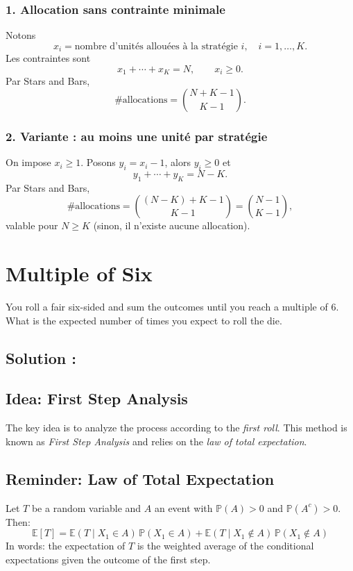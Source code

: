 \subsubsection*{1. Allocation sans contrainte minimale}

Notons
\[
x_i = \text{nombre d'unit\'es allou\'ees \`a la strat\'egie } i,\quad i=1,\dots,K.
\]
Les contraintes sont
\[
x_1+\cdots+x_K = N,\qquad x_i\ge 0.
\]
Par Stars and Bars,
\[
\boxed{\#\text{allocations} = \binom{N+K-1}{K-1}}.
\]

\subsubsection*{2. Variante : au moins une unit\'e par strat\'egie}

On impose $x_i\ge 1$. Posons $y_i=x_i-1$, alors $y_i\ge 0$ et
\[
y_1+\cdots+y_K = N-K.
\]
Par Stars and Bars,
\[
\boxed{\#\text{allocations} = \binom{(N-K)+K-1}{K-1}=\binom{N-1}{K-1}},
\]
valable pour $N\ge K$ (sinon, il n'existe aucune allocation).


\section{Multiple of Six}

\begin{exerciseBox}
You roll a fair six-sided and sum the outcomes until you reach a multiple of 6. What is the expected number of times you expect to roll the die.
\end{exerciseBox}


\subsection*{Solution :}


\subsection*{Idea: First Step Analysis}

The key idea is to analyze the process according to the \emph{first roll}.  
This method is known as \emph{First Step Analysis} and relies on the \emph{law of total expectation}.

\subsection*{Reminder: Law of Total Expectation}

Let $T$ be a random variable and $A$ an event with $\mathbb{P}(A)>0$ and $\mathbb{P}(A^c)>0$. Then:
\[
\boxed{
\mathbb{E}[T]
=
\mathbb{E}(T \mid X_1 \in A)\,\mathbb{P}(X_1 \in A)
+
\mathbb{E}(T \mid X_1 \notin A)\,\mathbb{P}(X_1 \notin A)
}
\]
In words: the expectation of $T$ is the weighted average of the conditional expectations given the outcome of the first step.

